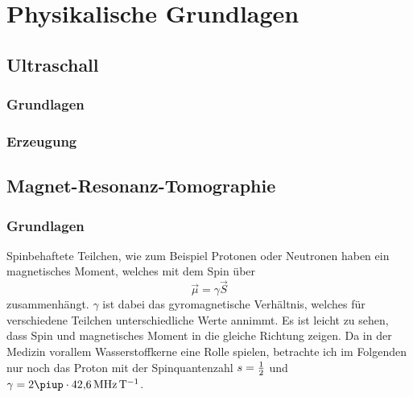 \documentclass[
    11pt,
    ngerman
]{scrreprt}
\begin{document}
\chapter{Physikalische Grundlagen}

\section{Ultraschall}

\subsection{Grundlagen}

\subsection{Erzeugung}

\section{Magnet-Resonanz-Tomographie}

\subsection{Grundlagen}

Spinbehaftete Teilchen, wie zum Beispiel Protonen oder Neutronen haben ein magnetisches Moment, welches mit dem Spin über
\[
    \vec\mu = \gamma\vec S
\]
zusammenhängt. $\gamma$ ist dabei das gyromagnetische Verhältnis, welches für
verschiedene Teilchen unterschiedliche Werte annimmt. Es ist leicht zu sehen,
dass Spin und magnetisches Moment in die gleiche Richtung zeigen. Da in der
Medizin vorallem Wasserstoffkerne eine Rolle spielen, betrachte ich im
Folgenden nur noch das Proton mit der Spinquantenzahl $s = \frac 12$ und $\gamma =
2\piup\cdot\SI{42.6}{\mega\hertz\per\tesla}$.
\end{document}
